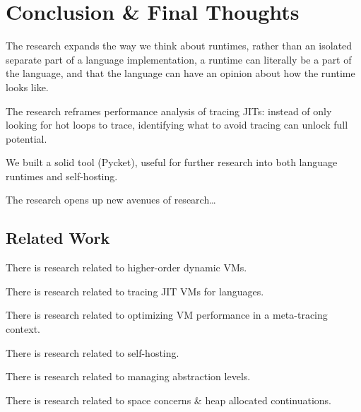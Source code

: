 \chapter{Conclusion \& Final Thoughts}

    \begin{chapterpoint}
        The research expands the way we think about runtimes, rather than an isolated separate
        part of a language implementation, a runtime can literally be a part of the language, 
        and that the language can have an opinion about how the runtime looks like.

        The research reframes performance analysis of tracing JITs: instead of only looking for hot loops to trace, identifying what to avoid tracing can unlock full potential.

        We built a solid tool (Pycket), useful for further research into both language runtimes and self-hosting.

        The research opens up new avenues of research\dots

    \end{chapterpoint}

    \section{Related Work}

        \begin{mainpoint}
            There is research related to higher-order dynamic VMs.

            There is research related to tracing JIT VMs for languages.

            There is research related to optimizing VM performance in a meta-tracing context.

            There is research related to self-hosting.

            There is research related to managing abstraction levels.

            There is research related to space concerns \& heap allocated continuations.

        \end{mainpoint}

